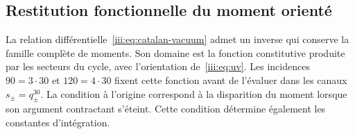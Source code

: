 \subsection{Restitution fonctionnelle du moment orienté}
\label{iii:sec:restitucion-funcional-catalan}

La relation différentielle~\eqref{iii:eq:catalan-vacuum} admet un
inverse qui conserve la famille complète de moments. Son domaine est
la fonction constitutive produite par les secteurs du cycle, avec
l’orientation de~\eqref{iii:eq:uv}. Les incidences $90=3\cdot30$ et
$120=4\cdot30$ fixent cette fonction avant de l’évaluer dans les canaux
$s_\pm=q_\pm^{30}$. La condition à l’origine correspond à la
disparition du moment lorsque son argument contractant s’éteint.
Cette condition détermine également les constantes d’intégration.


